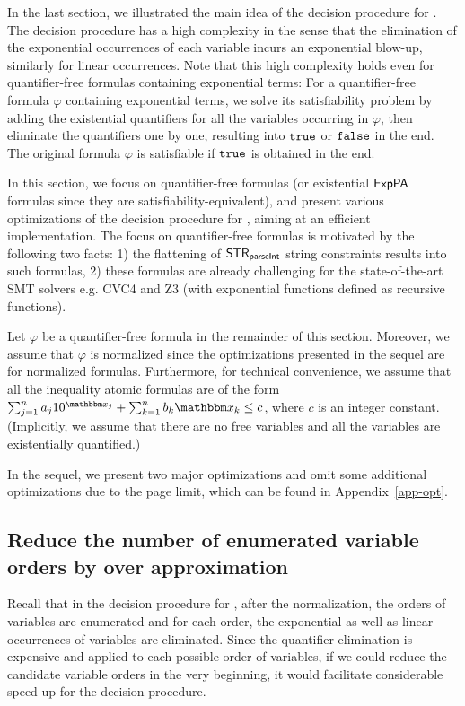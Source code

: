 
In the last section, we illustrated the main idea of the decision procedure for  {\paexp}. The decision procedure has a high complexity in the sense that the elimination of the exponential occurrences   of each variable incurs an exponential blow-up, similarly for linear occurrences. Note that this high complexity holds even for quantifier-free formulas containing exponential terms: For a quantifier-free formula $\varphi$ containing exponential terms, we solve its satisfiability problem by adding the existential quantifiers for all the variables occurring in $\varphi$, then eliminate the quantifiers one by one, resulting into $\mathtt{true}$ or $\mathtt{false}$ in the end. The original formula $\varphi$ is satisfiable if $\mathtt{true}$ is obtained in the end.

In this section, we focus on quantifier-free {\paexp} formulas (or existential {${\sf ExpPA}$} formulas since they are satisfiability-equivalent), and present various optimizations of the decision procedure for {\paexp}, aiming at an efficient implementation. The focus on quantifier-free {\paexp} formulas is motivated by the following two facts: 1) the flattening of {${\sf STR}_{\textsf{parseInt}}$} string constraints results into such formulas, 2) these formulas are already challenging for the state-of-the-art SMT solvers e.g. CVC4 and Z3 (with exponential functions defined as recursive functions). 

Let $\varphi$ be a quantifier-free {\paexp} formula in the remainder of this section. Moreover, we assume that $\varphi$ is normalized since the optimizations presented in the sequel are for normalized formulas. Furthermore, for technical convenience, we assume that all the inequality atomic formulas are of the form 
%
$\sum_{j=1}^{n} a_j 10^{\ivarx_{j}} + \sum_{k=1}^{n}b_k \ivarx_{k} \le c$, 
%
where $c$ is an integer constant. (Implicitly, we assume that there are no free variables and all the variables are existentially quantified.)

In the sequel, we present two major optimizations and omit some additional optimizations due to the page limit, which can be found in Appendix~\ref{app-opt}. 

\vspace*{-3mm}
\subsection{Reduce the number of enumerated variable orders by over approximation}

Recall that in the decision procedure for {\paexp}, after the normalization, the orders of variables are enumerated and for each order, the exponential as well as linear occurrences of variables are eliminated. Since the quantifier elimination is expensive and applied to each possible order of variables, if we could reduce the candidate variable orders in the very beginning, it would facilitate considerable speed-up for the decision procedure. 

